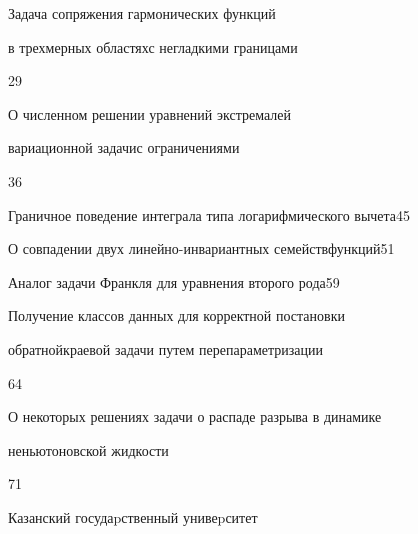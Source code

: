 

{Задача сопряжения гармонических функций 


в трехмерных областях\newline с негладкими границами}{29}




{О численном решении уравнений экстремалей 


вариационной задачи\newline с ограничениями}{36}




{Граничное поведение интеграла типа логарифмического вычета}{45}




{О совпадении двух линейно-инвариантных семейств\newline функций}{51}




{Аналог задачи Франкля для уравнения второго рода}{59}




{Получение классов данных для корректной постановки


обратной\newline краевой задачи путем перепараметризации}{64}




{О некоторых решениях задачи о распаде разрыва в динамике  \newline


неньютоновской жидкости}{71}


\medskip













\vfill


\noindent\raisebox{2pt}{\copyright} Казанский госудаpственный унивеpситет





